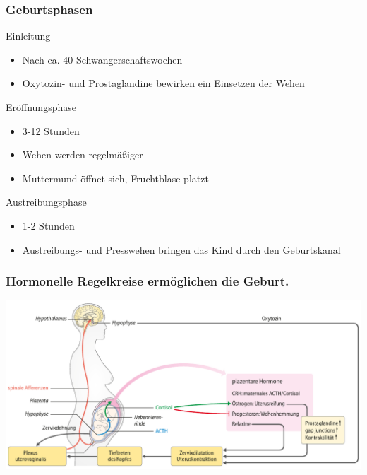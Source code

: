 \documentclass{beamer}
\begin{document}
\begin{frame}
\frametitle{Geburtsphasen }

\begin{block}{Einleitung}
\begin{itemize}
\item
Nach ca.  40 Schwangerschaftswochen
\item
Oxytozin- und Prostaglandine bewirken ein Einsetzen der Wehen
\end{itemize}
\end{block}


\begin{block}{Eröffnungsphase}
\begin{itemize}
\item
3-12 Stunden
\item
Wehen werden regelmäßiger
\item
Muttermund öffnet sich, Fruchtblase platzt
\end{itemize}
\end{block}


\begin{block}{Austreibungsphase}
\begin{itemize}
\item
1-2 Stunden
\item
Austreibungs- und Presswehen bringen das Kind durch den Geburtskanal
\end{itemize}
\end{block}


\end{frame}



\begin{frame}
\frametitle{Hormonelle Regelkreise ermöglichen die Geburt. }

\begin{center}
\includegraphics[width=\textwidth]{geburt_hormone}
\end{center}


\end{frame}
\end{document}
